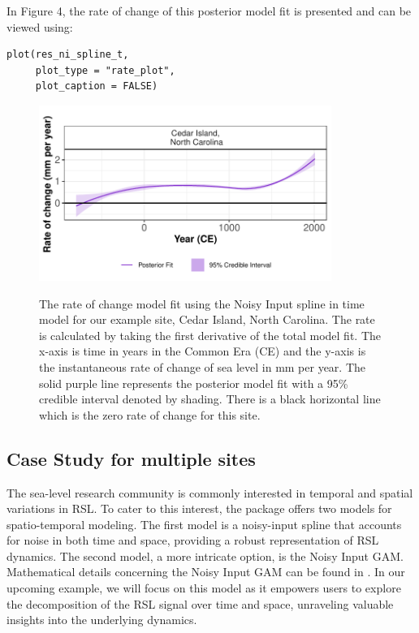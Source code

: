 \normalsize
In Figure 4, the rate of change of this posterior model fit is presented and can be viewed using:
\scriptsize
\begin{verbatim}
plot(res_ni_spline_t,
     plot_type = "rate_plot",
     plot_caption = FALSE)
\end{verbatim}
\begin{figure}
{\centering \includegraphics[width=360px]{RJ-2024-018_files/figure-latex/nisplinemodrate-1} 
}
\caption{The rate of change model fit using the Noisy Input spline in time model for our example site, Cedar Island, North Carolina. The rate is calculated by taking the first derivative of the total model fit. The x-axis is time in years in the Common Era (CE) and the y-axis is the instantaneous rate of change of sea level in mm per year. The solid purple line represents the posterior model fit with a 95\% credible interval denoted by shading. There is a black horizontal line which is the zero rate of change for this site.}\label{fig:nisplinemodrate}
\end{figure}
\normalsize
\subsection{Case Study for multiple sites}\label{casestudy2}
The sea-level research community is commonly interested in temporal and spatial variations in RSL. To cater to this interest, the  package offers two models for spatio-temporal modeling. The first model is a noisy-input spline that accounts for noise in both time and space, providing a robust representation of RSL dynamics. The second model, a more intricate option, is the Noisy Input GAM. Mathematical details concerning the Noisy Input GAM can be found in \citet{Upton2023noisy}. In our upcoming example, we will focus on this model as it empowers users to explore the decomposition of the RSL signal over time and space, unraveling valuable insights into the underlying dynamics.
